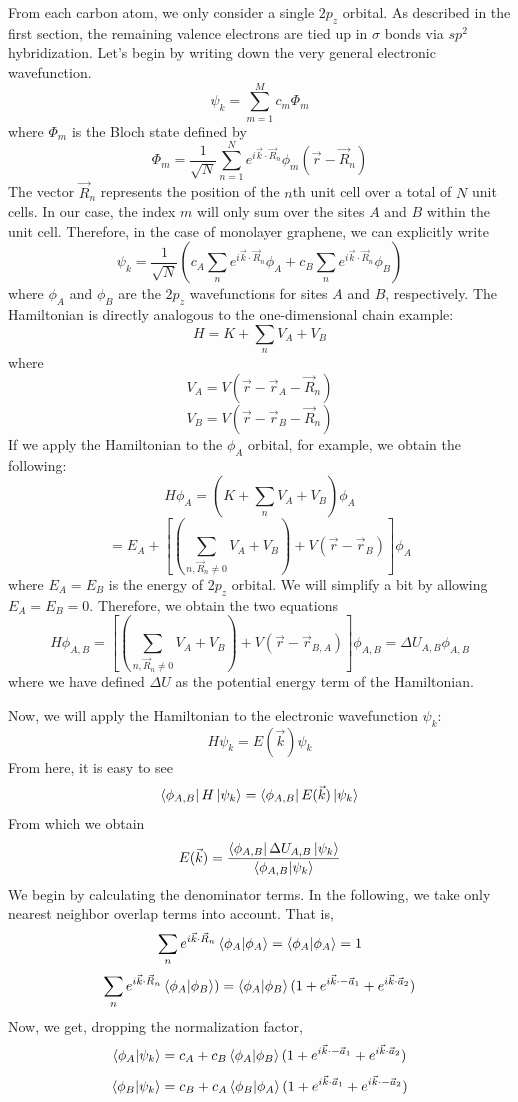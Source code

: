 \documentclass{article}
\begin{document}
From each carbon atom, we only consider a single $2p_{z}$ orbital. As described in the first section, the remaining valence electrons are tied
up in $\sigma$ bonds via $sp^{2}$ hybridization. Let's begin by writing down the very general electronic wavefunction.
$$\psi_{k} = \sum_{m = 1}^{M} c_{m}\Phi_{m}$$
where $\Phi_{m}$ is the Bloch state defined by
$$\Phi_{m} = \frac{1}{\sqrt{N}}\sum_{n=1}^{N} e^{i\vec{k}\cdot\vec{R}_{n}}\phi_{m}(\vec{r} - \vec{R}_{n})$$
The vector $\vec{R}_{n}$ represents the position of the $n$th unit cell over a total of $N$ unit cells. In our case, the index $m$ will only sum over the sites $A$ and $B$ within the unit cell.
Therefore, in the case of monolayer graphene, we can explicitly write
$$ \psi_{k} = \frac{1}{\sqrt{N}}(c_{A}\sum_{n}e^{i\vec{k}\cdot\vec{R}_{n}}\phi_{A} + c_{B}\sum_{n}e^{i\vec{k}\cdot\vec{R}_{n}}\phi_{B}) $$
where $\phi_{A}$ and $\phi_{B}$ are the $2p_{z}$ wavefunctions for sites $A$ and $B$, respectively. The Hamiltonian is directly analogous to the one-dimensional chain example:
$$ H = K + \sum_{n}V_{A} + V_{B} $$
where
$$V_{A} = V(\vec{r} - \vec{r}_{A} - \vec{R}_n)$$
$$V_{B} = V(\vec{r} - \vec{r}_{B} - \vec{R}_n)$$
If we apply the Hamiltonian to the $\phi_{A}$ orbital, for example, we obtain the following:
$$H\phi_{A} = (K + \sum_{n}V_{A} + V_{B})\phi_{A}$$
$$ = E_{A} + [(\sum_{n, \vec{R}_{n} \neq 0}V_{A} + V_{B}) + V(\vec{r} - \vec{r}_{B})] \phi_{A}$$
where $E_{A} = E_{B}$ is the energy of $2p_{z}$ orbital. We will simplify a bit by allowing $E_{A} = E_{B} = 0$. Therefore, we obtain the two equations
$$H\phi_{A,B} = [(\sum_{n, \vec{R}_{n} \neq 0}V_{A} + V_{B}) + V(\vec{r} - \vec{r}_{B,A})] \phi_{A,B} = \Delta U_{A,B}\phi_{A,B}$$
where we have defined $\Delta U$ as the potential energy term of the Hamiltonian. \par
Now, we will apply the Hamiltonian to the electronic wavefunction $\psi_{k}$:
$$H\psi_{k} = E(\vec{k})\psi_{k}$$
From here, it is easy to see
$$\bra{\phi_{A,B}}H\ket{\psi_{k}} = \bra{\phi_{A,B}}E(\vec{k})\ket{\psi_{k}}$$
From which we obtain
$$E(\vec{k}) = \frac{\bra{\phi_{A,B}}\Delta U_{A,B}\ket{\psi_{k}}}{\bra{\phi_{A,B}}\ket{\psi_{k}}}$$
We begin by calculating the denominator terms. In the following, we take only nearest neighbor overlap terms into account. That is,
$$\sum_{n}e^{i\vec{k}\cdot\vec{R}_{n}}\bra{\phi_{A}}\ket{\phi_{A}} = \bra{\phi_{A}}\ket{\phi_{A}} = 1$$
$$\sum_{n}e^{i\vec{k}\cdot\vec{R}_{n}}\bra{\phi_{A}}\ket{\phi_{B}}) = \bra{\phi_{A}}\ket{\phi_{B}}(1 + e^{i\vec{k}\cdot-\vec{a}_{1}} + e^{i\vec{k}\cdot\vec{a}_{2}})$$
Now, we get, dropping the normalization factor,
$$\bra{\phi_{A}}\ket{\psi_{k}} = c_{A} + c_{B}\bra{\phi_{A}}\ket{\phi_{B}}(1 + e^{i\vec{k}\cdot-\vec{a}_{1}} + e^{i\vec{k}\cdot\vec{a}_{2}}) $$
$$\bra{\phi_{B}}\ket{\psi_{k}} = c_{B} + c_{A}\bra{\phi_{B}}\ket{\phi_{A}}(1 + e^{i\vec{k}\cdot\vec{a}_{1}} + e^{i\vec{k}\cdot-\vec{a}_{2}})$$
\end{document}
